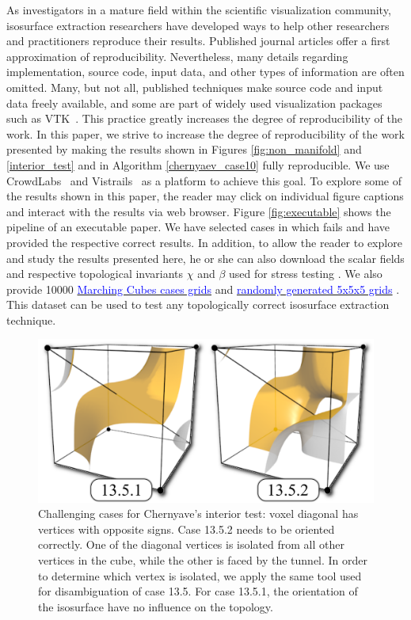 As investigators in a mature field within the scientific visualization community, isosurface extraction researchers have developed ways to help other researchers and practitioners reproduce their results. Published journal articles offer a first approximation of reproducibility. Nevertheless, many details regarding implementation, source code, input data, and other types of information are often omitted. Many, but not all, published techniques make source code and input data freely available, and some are part of widely used visualization packages such as VTK~\cite{vtk}. This practice greatly increases the degree of reproducibility of the work. 
In this paper, we strive to increase the degree of reproducibility of the work presented by making the results shown in Figures \ref{fig:non_manifold} and \ref{interior_test} and in Algorithm \ref{chernyaev_case10} fully reproducible. We use CrowdLabs~\cite{Tohline:2010jn} and Vistrails~\cite{Freire:2006va, Silva:2007:PVR:1300781.1302461} as a platform to achieve this goal. To explore some of the results shown in this paper, the  reader may click on individual figure captions and interact with the results via web browser. Figure \ref{fig:executable} shows the pipeline of an executable paper. 
%
We have selected cases in which \mc{} fails and have provided the respective correct results. In addition,  to allow the reader to explore and study the results presented here, he or she can also download the scalar fields and respective topological invariants $\chi$ and $\beta$ used for stress testing \mc. We also provide 10000 \href{http://liscustodio.github.io/C_MC33/MarchingCubes_cases.zip}{\textcolor{blue}{Marching Cubes cases grids}} and \href{http://liscustodio.github.io/C_MC33/Closed_Surfaces.zip}{\textcolor{blue}{randomly generated 5x5x5 grids}} \cite{lisOnline2013}. This dataset can be used to test any topologically correct isosurface extraction technique.


\begin{figure}[b]
     \centering
     \includegraphics[width=0.8\linewidth]{chapter4/figures/case-13.png}
     \caption{Challenging cases for Chernyave's interior test: voxel diagonal has vertices with opposite signs. Case 13.5.2 needs to be oriented correctly. One of the diagonal vertices is isolated from all other vertices in the cube, while the other is faced by the tunnel. In order to determine which vertex is isolated, we apply the same tool used for disambiguation of case 13.5. For case 13.5.1, the orientation of the isosurface have no influence on the topology. }
     \label{fig:case13}
\end{figure}



